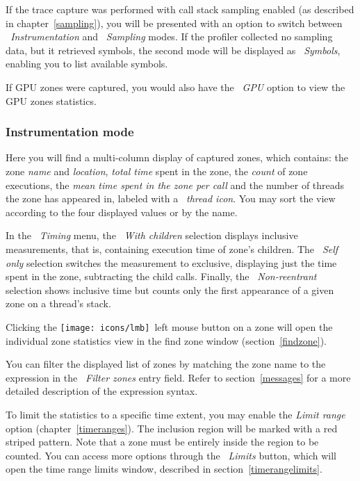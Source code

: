 \documentclass[hidelinks,titlepage,a4paper,twoside]{article}
\newcommand{\LMB}{\texttt{[image: icons/lmb]}}
\begin{document}
If the trace capture was performed with call stack sampling enabled (as described in chapter~\ref{sampling}), you will be presented with an option to switch between \emph{\faSyringe{}~Instrumentation} and \emph{\faEyeDropper{}~Sampling} modes. If the profiler collected no sampling data, but it retrieved symbols, the second mode will be displayed as \emph{\faPuzzlePiece{}~Symbols}, enabling you to list available symbols.

If GPU zones were captured, you would also have the \emph{\faEye{}~GPU} option to view the GPU zones statistics.

\subsubsection{Instrumentation mode}

Here you will find a multi-column display of captured zones, which contains: the zone \emph{name} and \emph{location}, \emph{total time} spent in the zone, the \emph{count} of zone executions, the \emph{mean time spent in the zone per call} and the number of threads the zone has appeared in, labeled with a \emph{\faRandom~thread icon}. You may sort the view according to the four displayed values or by the name.

In the \emph{~Timing} menu, the \emph{~With children} selection displays inclusive measurements, that is, containing execution time of zone's children. The \emph{~Self only} selection switches the measurement to exclusive, displaying just the time spent in the zone, subtracting the child calls. Finally, the \emph{~Non-reentrant} selection shows inclusive time but counts only the first appearance of a given zone on a thread's stack.

Clicking the \LMB{}~left mouse button on a zone will open the individual zone statistics view in the find zone window (section~\ref{findzone}).

You can filter the displayed list of zones by matching the zone name to the expression in the \emph{\faFilter{}~Filter zones} entry field. Refer to section~\ref{messages} for a more detailed description of the expression syntax.

To limit the statistics to a specific time extent, you may enable the \emph{Limit range} option (chapter~\ref{timeranges}). The inclusion region will be marked with a red striped pattern. Note that a zone must be entirely inside the region to be counted. You can access more options through the \emph{\faRuler{}~Limits} button, which will open the time range limits window, described in section~\ref{timerangelimits}.
\end{document}

